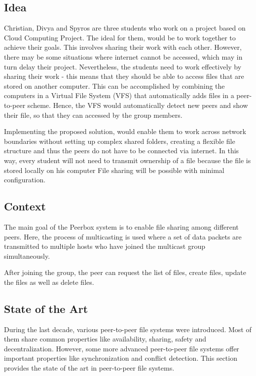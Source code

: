 
\subsection{Idea}

Christian, Divya and Spyros are three students who work on a project based on Cloud Computing Project. The ideal for them, would be to work together to achieve their goals. This involves sharing their work with each other. However, there may be some situations where internet cannot be accessed, which may in turn delay their project. Nevertheless, the students need to work effectively by sharing their work - this means that they should be able to access files that are stored on another computer. This can be accomplished by combining the computers in a Virtual File System (VFS) that automatically adds files in a peer-to-peer scheme. Hence, the VFS would automatically detect new peers and show their file, so that they can accessed by the group members.

Implementing the proposed solution, would  enable them to work across network boundaries without setting up complex shared folders, creating a flexible file structure and thus the peers do not have to be connected via internet. In this way, every student will not need to transmit ownership of a file because the file is stored locally on his computer File sharing will be possible with minimal configuration. 



\subsection{Context}
The main goal of the Peerbox system is to enable file sharing among different peers. Here, the process of multicasting is used where a set of data packets are transmitted to  multiple hosts who have joined the multicast group simultaneously. 

After joining the group, the peer can request the list of files, create files, update the files as well as delete files. 



\subsection{State of the Art}

During the last decade, various peer-to-peer file systems were introduced. Most of them share common properties like availability, sharing, safety and decentralization. However, some more advanced peer-to-peer file systems offer important properties like synchronization and conflict detection. This section provides the state of the art in peer-to-peer file systems.

